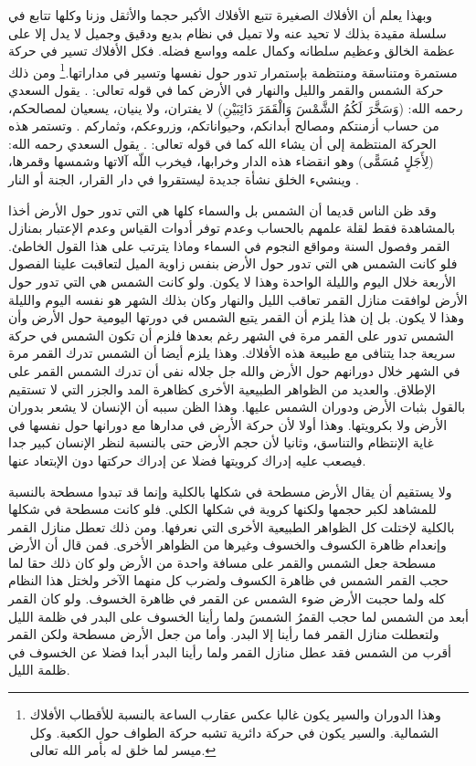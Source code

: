 وبهذا يعلم أن الأفلاك الصغيرة تتبع الأفلاك الأكبر حجما والأثقل وزنا وكلها تتابع في سلسلة مقيدة بذلك لا تحيد عنه ولا تميل في نظام بديع ودقيق وجميل لا يدل إلا على عظمة الخالق وعظيم سلطانه وكمال علمه وواسع فضله. فكل الأفلاك تسير في حركة مستمرة ومتناسقة ومنتظمة بإستمرار تدور حول نفسها وتسير في مداراتها.\footnote{وهذا الدوران والسير يكون غالبا عكس عقارب الساعة بالنسبة للأقطاب الأفلاك الشمالية. والسير يكون في حركة دائرية تشبه حركة الطواف حول الكعبة. وكل ميسر لما خلق له بأمر الله تعالى.} ومن ذلك حركة الشمس والقمر والليل والنهار في الأرض كما في قوله تعالى: \quranayah*[14][33]{\footnotesize (\surahname*[14])}. يقول السعدي رحمه الله: (وَسَخَّرَ لَكُمُ الشَّمْسَ وَالْقَمَرَ دَائِبَيْنِ) لا يفتران، ولا ينيان، يسعيان لمصالحكم، من حساب أزمنتكم ومصالح أبدانكم، وحيواناتكم، وزروعكم، وثماركم \href{https://shamela.ws/book/42/905#p5}{\faExternalLink} \cite{tafsir_Saadi}. وتستمر هذه الحركة المنتظمة إلى أن يشاء الله كما في قوله تعالى: \quranayah*[39][5]{\footnotesize (\surahname*[39])}. \href{https://shamela.ws/book/42/905#p5}{\faExternalLink} \cite{tafsir_Saadi} يقول السعدي رحمه الله: (لِأَجَلٍ مُسَمًّى) وهو انقضاء هذه الدار وخرابها، فيخرب اللّه آلاتها وشمسها وقمرها، وينشيء الخلق نشأة جديدة ليستقروا في دار القرار، الجنة أو النار \href{https://shamela.ws/book/42/1623#p4}{\faExternalLink} \cite{tafsir_Saadi}.

وقد ظن الناس قديما أن الشمس بل والسماء كلها هي التي تدور حول الأرض أخذا بالمشاهدة فقط لقلة علمهم بالحساب وعدم توفر أدوات القياس وعدم الإعتبار بمنازل القمر وفصول السنة ومواقع النجوم في السماء وماذا يترتب على هذا القول الخاطئ. فلو كانت الشمس هي التي تدور حول الأرض بنفس زاوية الميل لتعاقبت علينا الفصول الأربعة خلال اليوم والليلة الواحدة وهذا لا يكون. ولو كانت الشمس هي التي تدور حول الأرض لوافقت منازل القمر تعاقب الليل والنهار وكان بذلك الشهر هو نفسه اليوم والليلة وهذا لا يكون. بل إن هذا يلزم أن القمر يتبع الشمس في دورتها اليومية حول الأرض وأن الشمس تدور على القمر مرة في الشهر رغم بعدها فلزم أن تكون الشمس في حركة سريعة جدا يتنافى مع طبيعة هذه الأفلاك. وهذا يلزم أيضا أن الشمس تدرك القمر مرة في الشهر خلال دورانهم حول الأرض والله جل جلاله نفى أن تدرك الشمس القمر على الإطلاق. والعديد من الظواهر الطبيعية الأخرى كظاهرة المد والجزر التي لا تستقيم بالقول بثبات الأرض ودوران الشمس عليها. وهذا الظن سببه أن الإنسان لا يشعر بدوران الأرض ولا بكرويتها. وهذا أولا لأن حركة الأرض في مدارها مع دورانها حول نفسها في غاية الإنتظام والتناسق، وثانيا لأن حجم الأرض حتى بالنسبة لنظر الإنسان كبير جدا فيصعب عليه إدراك كرويتها فضلا عن إدراك حركتها دون الإبتعاد عنها.

ولا يستقيم أن يقال الأرض مسطحة في شكلها بالكلية وإنما قد تبدوا مسطحة بالنسبة للمشاهد لكبر حجمها ولكنها كروية في شكلها الكلي. فلو كانت مسطحة في شكلها بالكلية لإختلت كل الظواهر الطبيعية الأخرى التي نعرفها. ومن ذلك تعطل منازل القمر وإنعدام ظاهرة الكسوف والخسوف وغيرها من الظواهر الأخرى. فمن قال أن الأرض مسطحة جعل الشمس والقمر على مسافة واحدة من الأرض ولو كان ذلك حقا لما حجب القمر الشمس في ظاهرة الكسوف ولضرب كل منهما الآخر ولختل هذا النظام كله ولما حجبت الأرض ضوء الشمس عن القمر في ظاهرة الخسوف. ولو كان القمر أبعد من الشمس لما حجب القمرُ الشمسَ ولما رأينا الخسوف على البدر في ظلمة الليل ولتعطلت منازل القمر فما رأينا إلا البدر. وأما من جعل الأرض مسطحة ولكن القمر أقرب من الشمس فقد عطل منازل القمر ولما رأينا البدر أبدا فضلا عن الخسوف في ظلمة الليل. 


